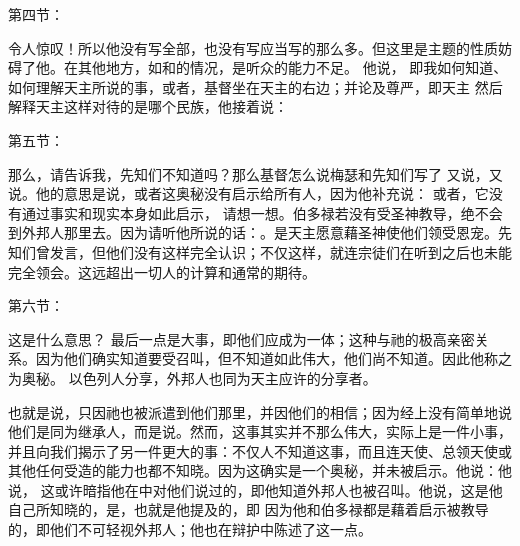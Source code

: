 第四节：\par

令人惊叹！所以他没有写全部，也没有写应当写的那么多。但这里是主题的性质妨碍了他。在其他地方，如和的情况，是听众的能力不足。 他说， 即我如何知道、如何理解天主所说的事，或者，基督坐在天主的右边；并论及尊严，即天主 然后解释天主这样对待的是哪个民族，他接着说：\par

第五节：\par

那么，请告诉我，先知们不知道吗？那么基督怎么说梅瑟和先知们写了 又说，又说。他的意思是说，或者这奥秘没有启示给所有人，因为他补充说： 或者，它没有通过事实和现实本身如此启示， 请想一想。伯多禄若没有受圣神教导，绝不会到外邦人那里去。因为请听他所说的话：。是天主愿意藉圣神使他们领受恩宠。先知们曾发言，但他们没有这样完全认识；不仅这样，就连宗徒们在听到之后也未能完全领会。这远超出一切人的计算和通常的期待。\par

第六节：\par

这是什么意思？ 最后一点是大事，即他们应成为一体；这种与祂的极高亲密关系。因为他们确实知道要受召叫，但不知道如此伟大，他们尚不知道。因此他称之为奥秘。 以色列人分享，外邦人也同为天主应许的分享者。\par

\par

也就是说，只因祂也被派遣到他们那里，并因他们的相信；因为经上没有简单地说他们是同为继承人，而是说。然而，这事其实并不那么伟大，实际上是一件小事，并且向我们揭示了另一件更大的事：不仅人不知道这事，而且连天使、总领天使或其他任何受造的能力也都不知晓。因为这确实是一个奥秘，并未被启示。他说：他说， 这或许暗指他在中对他们说过的，即他知道外邦人也被召叫。他说，这是他自己所知晓的，是，也就是他提及的，即 因为他和伯多禄都是藉着启示被教导的，即他们不可轻视外邦人；他也在辩护中陈述了这一点。\par

